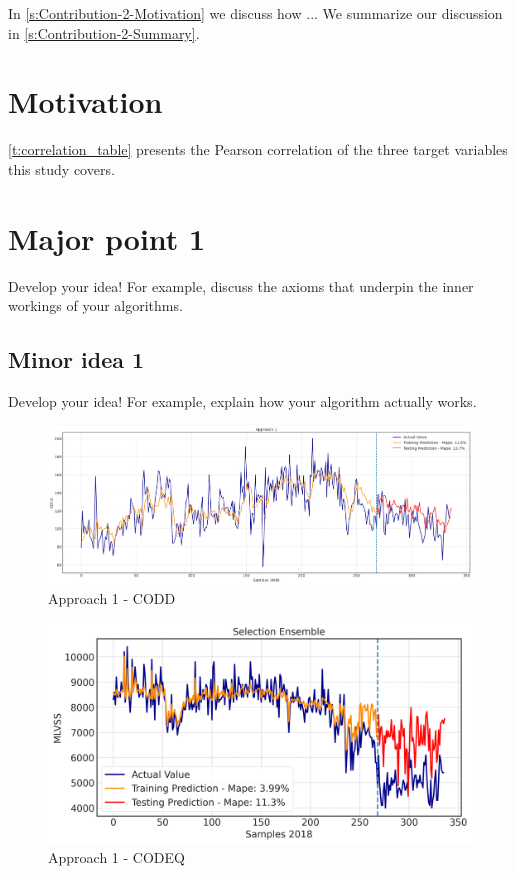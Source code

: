 In \autoref{s:Contribution-2-Motivation} we discuss how ...  We summarize our discussion in \autoref{s:Contribution-2-Summary}.

\section{Motivation}
\label{s:Contribution-2-Motivation}


\autoref{t:correlation_table} presents the Pearson correlation of the three target variables this study covers.

\section{Major point 1}
\label{s:Contribution-2-Major-1}
Develop your idea! For example, discuss the axioms that underpin the inner workings of your algorithms.

\subsection{Minor idea 1}
\label{s:Contribution-2-Major-1-Minor-1}
Develop your idea! For example, explain how your algorithm actually works.

\begin{figure}[h]
\centering
\includegraphics[width=\linewidth]{figures/Ch4/CODd-1.png}
\caption{Approach 1 - CODD}
\label{f:App1-codd}
\end{figure}

\begin{figure}[h]
\centering
\includegraphics[width=\linewidth]{figures/test2.png}
\caption{Approach 1 - CODEQ}
\label{f:App1-codeq}
\end{figure}

